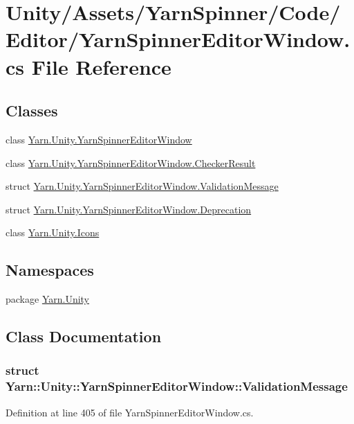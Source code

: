 \hypertarget{a00270}{\section{Unity/\-Assets/\-Yarn\-Spinner/\-Code/\-Editor/\-Yarn\-Spinner\-Editor\-Window.cs File Reference}
\label{a00270}
}
\subsection*{Classes}
\begin{DoxyCompactItemize}
\item 
class \hyperlink{a00164}{Yarn.\-Unity.\-Yarn\-Spinner\-Editor\-Window}
\item 
class \hyperlink{a00047}{Yarn.\-Unity.\-Yarn\-Spinner\-Editor\-Window.\-Checker\-Result}
\item 
struct \hyperlink{a00164_a00355}{Yarn.\-Unity.\-Yarn\-Spinner\-Editor\-Window.\-Validation\-Message}
\item 
struct \hyperlink{a00086}{Yarn.\-Unity.\-Yarn\-Spinner\-Editor\-Window.\-Deprecation}
\item 
class \hyperlink{a00106}{Yarn.\-Unity.\-Icons}
\end{DoxyCompactItemize}
\subsection*{Namespaces}
\begin{DoxyCompactItemize}
\item 
package \hyperlink{a00127}{Yarn.\-Unity}
\end{DoxyCompactItemize}


\subsection{Class Documentation}
\label{a00355}
\hypertarget{a00164_a00355}{}
\subsubsection{struct Yarn\-:\-:Unity\-:\-:Yarn\-Spinner\-Editor\-Window\-:\-:Validation\-Message}


Definition at line 405 of file Yarn\-Spinner\-Editor\-Window.\-cs.



